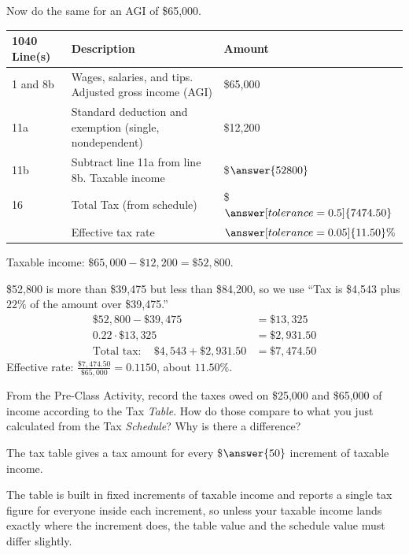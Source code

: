 \documentclass[12pt]{ximera}
\begin{document}
\begin{problem}
Now do the same for an AGI of \$65,000.

\begin{center}
\begin{tabular}{|l|l|l|}
\hline
1040 Line(s) & Description & Amount \\
\hline
1 and 8b & Wages, salaries, and tips. Adjusted gross income (AGI) & \$65,000 \\
\hline
11a & Standard deduction and exemption (single, nondependent) & \$12,200 \\
\hline
11b & Subtract line 11a from line 8b. Taxable income & \$$\answer{52800}$ \\
\hline
16 & Total Tax (from schedule) & \$$\answer[tolerance=0.5]{7474.50}$ \\
\hline
 & Effective tax rate & $\answer[tolerance=0.05]{11.50}\%$ \\
\hline
\end{tabular}
\end{center}

\begin{solution}
Taxable income: $\$65{,}000 - \$12{,}200 = \$52{,}800$.

\$52,800 is more than \$39,475 but less than \$84,200, so we use ``Tax is \$4,543
plus $22\%$ of the amount over \$39,475.''
\[
\begin{aligned}
\$52{,}800 - \$39{,}475 &= \$13{,}325 \\
0.22 \cdot \$13{,}325 &= \$2{,}931.50 \\
\text{Total tax}: \quad \$4{,}543 + \$2{,}931.50 &= \$7{,}474.50
\end{aligned}
\]
Effective rate: $\frac{\$7{,}474.50}{\$65{,}000} = 0.1150$, about $11.50\%$.
\end{solution}
\end{problem}

\begin{problem}
From the Pre-Class Activity, record the taxes owed on \$25,000 and \$65,000 of income
according to the Tax \emph{Table}. How do those compare to what you just calculated
from the Tax \emph{Schedule}? Why is there a difference?

\begin{freeResponse}
\end{freeResponse}

The tax table gives a tax amount for every \$$\answer{50}$ increment of taxable income.

\begin{solution}
The table is built in fixed increments of taxable income and reports a single tax
figure for everyone inside each increment, so unless your taxable income lands exactly
where the increment does, the table value and the schedule value must differ slightly.
\end{solution}
\end{problem}
\end{document}
